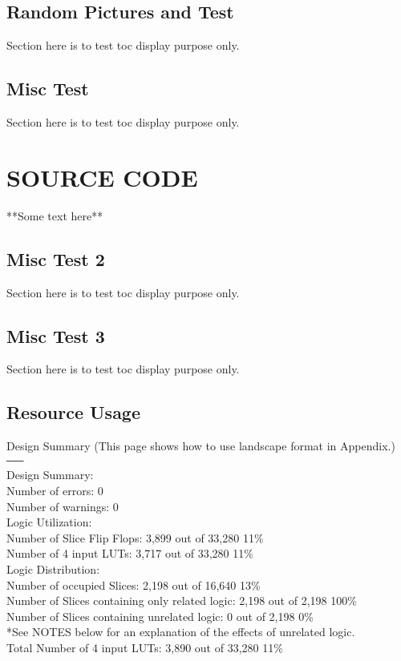 \section{Random Pictures and Test}
Section here is to test toc display purpose only.

\section{Misc Test}
Section here is to test toc display purpose only.

\chapter{SOURCE CODE}

**Some text here**

\section{Misc Test 2}
Section here is to test toc display purpose only.

\section{Misc Test 3}
Section here is to test toc display purpose only.

\section{Resource Usage}
\begin{landscape}
\noindent
Design Summary (This page shows how to use landscape format in Appendix.)\\
\texttt{---------}\\
Design Summary:\\
Number of errors: 0\\
Number of warnings: 0\\
Logic Utilization:\\
Number of Slice Flip Flops: 3,899 out of 33,280 11\%\\
Number of 4 input LUTs: 3,717 out of 33,280 11\%\\
Logic Distribution:\\
Number of occupied Slices: 2,198 out of 16,640 13\%\\
Number of Slices containing only related logic: 2,198 out of 2,198 100\%\\
Number of Slices containing unrelated logic: 0 out of 2,198 0\%\\
*See NOTES below for an explanation of the effects of unrelated logic.\\
Total Number of 4 input LUTs: 3,890 out of 33,280 11\%\\

\end{landscape}


